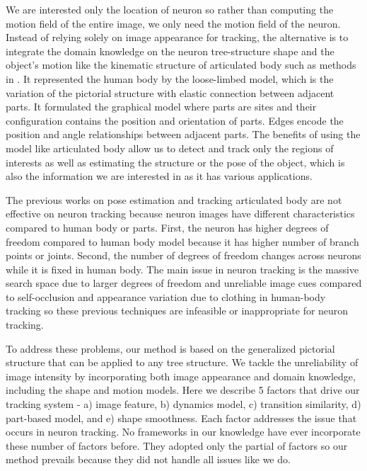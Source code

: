 \documentclass{article}
\begin{document}
We are interested only the location of neuron so rather than computing the motion field of the entire image, we only need the motion field of the neuron. Instead of relying solely on image appearance for tracking, the alternative is to integrate the domain knowledge on the neuron tree-structure shape and the object's motion like the kinematic structure of articulated body such as methods in \cite{Sigal2004, Han2005}. It represented the human body by the loose-limbed model, which is the variation of the pictorial structure \cite{Fischler1973, Felzenszwalb2005} with elastic connection between adjacent parts. It formulated the graphical model where parts are sites and their configuration contains the position and orientation of parts. Edges encode the position and angle relationships between adjacent parts. The benefits of using the model like articulated body allow us to detect and track only the regions of interests as well as estimating the structure or the pose of the object, which is also the information we are interested in as it has various applications.

The previous works on pose estimation and tracking articulated body are not effective on neuron tracking because neuron images have different characteristics compared to human body or parts. First, the neuron has higher degrees of freedom compared to human body model because it has higher number of branch points or joints. Second, the number of degrees of freedom changes across neurons while it is fixed in human body. The main issue in neuron tracking is the massive search space due to larger degrees of freedom and unreliable image cues compared to self-occlusion and appearance variation due to clothing in human-body tracking so these previous techniques are infeasible or inappropriate for neuron tracking.

To address these problems, our method is based on the generalized pictorial structure that can be applied to any tree structure. We tackle the unreliability of image intensity by incorporating both image appearance and domain knowledge, including the shape and motion models. Here we describe 5 factors that drive our tracking system - a) image feature, b) dynamics model, c) transition similarity, d) part-based model, and e) shape smoothness. Each factor addresses the issue that occurs in neuron tracking. No frameworks in our knowledge have ever incorporate these number of factors before. They adopted only the partial of factors so our method prevails because they did not handle all issues like we do.
\end{document}
